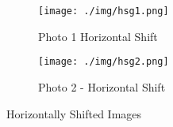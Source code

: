 \begin{figure}[!ht]
  \centering
  \begin{subfigure}{\textwidth}
    \centering
    \texttt{[image: ./img/hsg1.png]}
    \caption{Photo 1
    Horizontal Shift}
    \label{fig:p1hg}
  \end{subfigure}
  \begin{subfigure}{\textwidth}
    \centering
    \texttt{[image: ./img/hsg2.png]}
    \caption{Photo
      2
      -
      Horizontal
    Shift}
    \label{fig:p2hg}
  \end{subfigure}
  \caption{Horizontally
    Shifted
  Images}
  \label{fig:hs_images}
\end{figure}

